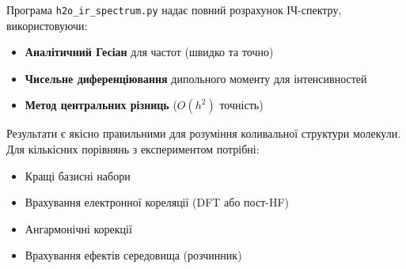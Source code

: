 {Програма \texttt{h2o\_ir\_spectrum.py} надає повний розрахунок ІЧ-спектру, використовуючи:

\begin{itemize}
    \item \textbf{Аналітичний Гесіан} для частот (швидко та точно)
    \item \textbf{Чисельне диференціювання} дипольного моменту для інтенсивностей
    \item \textbf{Метод центральних різниць} ($O(h^2)$ точність)
\end{itemize}

Результати є якісно правильними для розуміння коливальної структури молекули. Для кількісних порівнянь з експериментом потрібні:
\begin{itemize}
    \item Кращі базисні набори
    \item Врахування електронної кореляції (DFT або пост-HF)
    \item Ангармонічні корекції
    \item Врахування ефектів середовища (розчинник)
\end{itemize}

%
%
%
%

}

